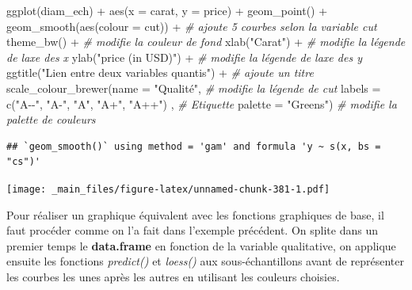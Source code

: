 \documentclass[
]{book}
\newenvironment{Shaded}{\begin{snugshade}}{\end{snugshade}}
\newcommand{\AttributeTok}[1]{\textcolor[rgb]{0.77,0.63,0.00}{#1}}
\newcommand{\CommentTok}[1]{\textcolor[rgb]{0.56,0.35,0.01}{\textit{#1}}}
\newcommand{\FunctionTok}[1]{\textcolor[rgb]{0.00,0.00,0.00}{#1}}
\newcommand{\NormalTok}[1]{#1}
\newcommand{\SpecialCharTok}[1]{\textcolor[rgb]{0.00,0.00,0.00}{#1}}
\newcommand{\StringTok}[1]{\textcolor[rgb]{0.31,0.60,0.02}{#1}}
\theoremstyle{definition}
\theoremstyle{definition}
\theoremstyle{definition}
\theoremstyle{definition}
\theoremstyle{remark}
\begin{document}
\begin{Shaded}
\begin{Highlighting}[]
\FunctionTok{ggplot}\NormalTok{(diam\_ech) }\SpecialCharTok{+} 
  \FunctionTok{aes}\NormalTok{(}\AttributeTok{x =}\NormalTok{ carat, }\AttributeTok{y =}\NormalTok{ price) }\SpecialCharTok{+} 
  \FunctionTok{geom\_point}\NormalTok{() }\SpecialCharTok{+} 
  \FunctionTok{geom\_smooth}\NormalTok{(}\FunctionTok{aes}\NormalTok{(}\AttributeTok{colour =}\NormalTok{ cut)) }\SpecialCharTok{+} \CommentTok{\# ajoute 5 courbes selon la variable cut}
  \FunctionTok{theme\_bw}\NormalTok{() }\SpecialCharTok{+}                     \CommentTok{\# modifie la couleur de fond}
  \FunctionTok{xlab}\NormalTok{(}\StringTok{"Carat"}\NormalTok{) }\SpecialCharTok{+}                  \CommentTok{\# modifie la légende de l\textquotesingle{}axe des x}
  \FunctionTok{ylab}\NormalTok{(}\StringTok{"price (in USD)"}\NormalTok{) }\SpecialCharTok{+}         \CommentTok{\# modifie la légende de l\textquotesingle{}axe des y}
  \FunctionTok{ggtitle}\NormalTok{(}\StringTok{"Lien entre deux variables quantis"}\NormalTok{) }\SpecialCharTok{+}   \CommentTok{\# ajoute un titre}
  \FunctionTok{scale\_colour\_brewer}\NormalTok{(}\AttributeTok{name =} \StringTok{"Qualité"}\NormalTok{,   }\CommentTok{\# modifie la légende de cut}
                    \AttributeTok{labels =} \FunctionTok{c}\NormalTok{(}\StringTok{"A{-}{-}"}\NormalTok{, }\StringTok{"A{-}"}\NormalTok{, }\StringTok{"A"}\NormalTok{, }\StringTok{"A+"}\NormalTok{, }\StringTok{"A++"}\NormalTok{) , }\CommentTok{\# Etiquette}
                    \AttributeTok{palette =} \StringTok{"Greens"}\NormalTok{)   }\CommentTok{\# modifie la palette de couleurs }
\end{Highlighting}
\end{Shaded}

\begin{verbatim}
## `geom_smooth()` using method = 'gam' and formula 'y ~ s(x, bs = "cs")'
\end{verbatim}

\texttt{[image: \_main\_files/figure-latex/unnamed-chunk-381-1.pdf]}

Pour réaliser un graphique équivalent avec les fonctions graphiques de base, il faut procéder comme on l'a fait dans l'exemple précédent. On splite dans un premier temps le \textbf{data.frame} en fonction de la variable qualitative, on applique ensuite les fonctions \emph{predict()} et \emph{loess()} aux sous-échantillons avant de représenter les courbes les unes après les autres en utilisant les couleurs choisies.
\end{document}
